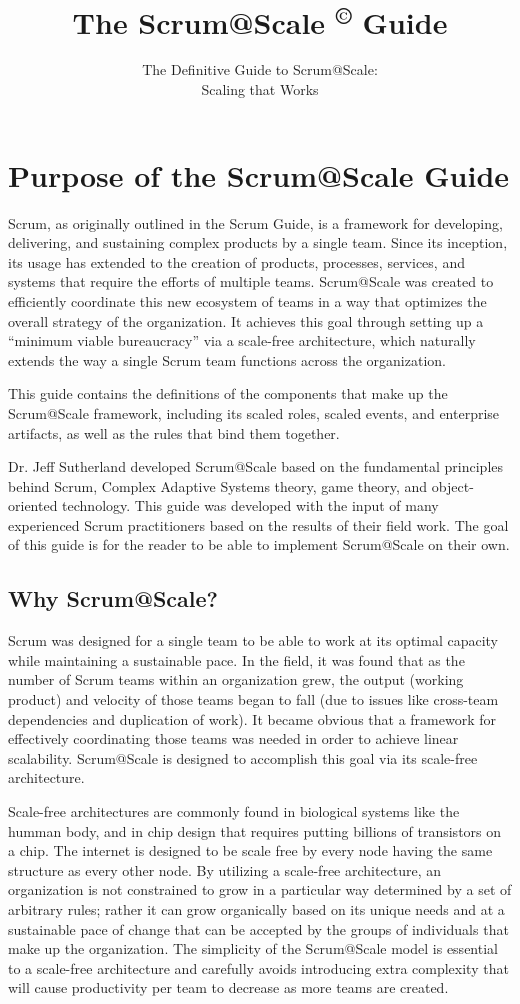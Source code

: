 \documentclass[12pt,a4paper,parskip=full]{scrartcl}
\title{\Huge{\color{red}\textbf{The Scrum@Scale
\textsuperscript{\copyright}
Guide}}}
\subtitle{\color{gray}The Definitive Guide to Scrum@Scale:\\ Scaling that
Works}
\date{}
\begin{document}

\section{Purpose of the Scrum@Scale Guide}
Scrum, as originally outlined in the Scrum Guide, is a framework for
developing, delivering, and sustaining complex products by a single team.
Since its inception, its usage has extended to the creation of products,
processes, services, and systems that require the efforts of multiple
teams. Scrum@Scale was created to efficiently coordinate this new ecosystem
of teams in a way that optimizes the overall strategy of the organization.
It achieves this goal through setting up a ``minimum viable bureaucracy''
via a scale-free architecture, which naturally extends the way a single
Scrum team functions across the organization.

This guide contains the definitions of the components that make up the
Scrum@Scale framework, including its scaled roles, scaled events, and
enterprise artifacts, as well as the rules that bind them together.

Dr. Jeff Sutherland developed Scrum@Scale based on the fundamental
principles behind Scrum, Complex Adaptive Systems theory, game theory, and
object-oriented technology. This guide was developed with the input of many
experienced Scrum practitioners based on the results of their field work.
The goal of this guide is for the reader to be able to implement Scrum@Scale
on their own.

\subsection{Why Scrum@Scale?}
Scrum was designed for a single team to be able to work at its optimal
capacity while maintaining a sustainable pace. In the field, it was found
that as the number of Scrum teams within an organization grew, the 
output (working product) and velocity of those teams began to fall (due to
issues like cross-team dependencies and duplication of work). It became
obvious that a framework for effectively coordinating those teams was
needed in order to achieve linear scalability. Scrum@Scale is designed to
accomplish this goal via its scale-free architecture.

Scale-free architectures are commonly found in biological systems like the humman body, and in chip design that requires putting billions of transistors on a chip. The internet is designed to be scale free by every node having the same structure as every other node. By utilizing a scale-free architecture, an organization is not constrained
to grow in a particular way determined by a set of arbitrary rules; rather
it can grow organically based on its unique needs and at a sustainable pace
of change that can be accepted by the groups of individuals that make up
the organization. The simplicity of the Scrum@Scale model is essential to a scale-free architecture and carefully avoids introducing extra complexity that will cause productivity per team to decrease as more teams are created.
\end{document}
